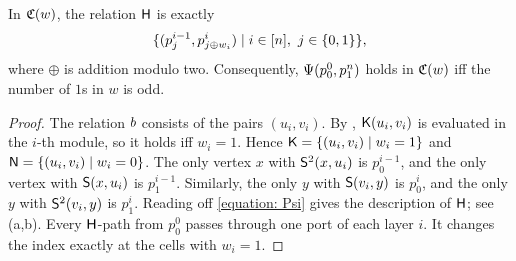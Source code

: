 \begin{lemma}[Parity]\label{lemma: parity}
  In $\mathfrak{C}(w)$, the relation $\mathsf{H}$ is exactly
  \[
    \{(p^{i-1}_{j}, p^{i}_{j \oplus w_i}) \mid i \in [n],\ j \in \{0, 1\}\},
  \]
  where $\oplus$ is addition modulo two.
  Consequently, $\Psi(p^{0}_{0}, p^{n}_{1})$ holds in $\mathfrak{C}(w)$ iff the number of $1$s in $w$ is odd.
\end{lemma}
\begin{proof}
  The relation $b$ consists of the pairs $(u_i, v_i)$.
  By , $\mathsf{K}(u_i, v_i)$ is evaluated in the $i$-th module, so it holds iff $w_i = 1$.
  Hence $\mathsf{K} = \{(u_i, v_i) \mid w_i = 1\}$ and $\mathsf{N} = \{(u_i, v_i) \mid w_i = 0\}$.
  The only vertex $x$ with $\mathsf{S}^{2}(x, u_i)$ is $p^{i-1}_0$, and the only vertex with $\mathsf{S}(x, u_i)$ is $p^{i-1}_1$.
  Similarly, the only $y$ with $\mathsf{S}(v_i, y)$ is $p^{i}_0$, and the only $y$ with $\mathsf{S}^{2}(v_i, y)$ is $p^{i}_1$.
  Reading off \eqref{equation: Psi} gives the description of $\mathsf{H}$; see (a,b).
  Every $\mathsf{H}$-path from $p^{0}_{0}$ passes through one port of each layer $i$.
  It changes the index exactly at the cells with $w_i = 1$.
\end{proof}
